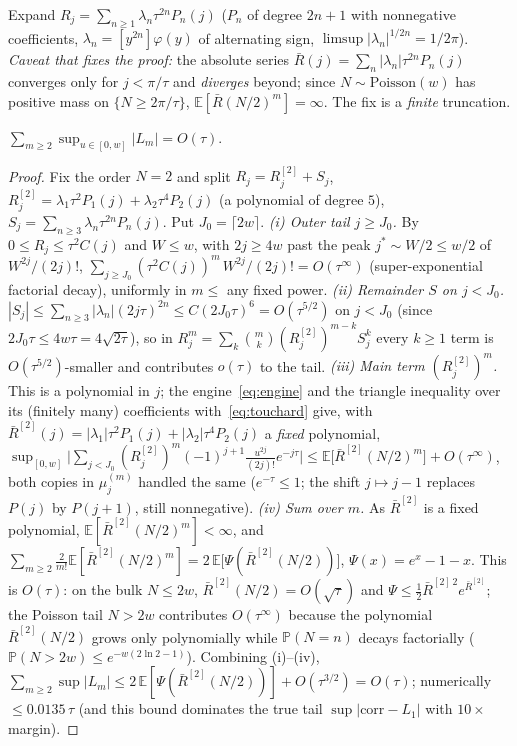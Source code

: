 Expand $R_j=\sum_{n\ge1}\lambda_n\tau^{2n}P_n(j)$ ($P_n$ of degree $2n{+}1$ with nonnegative
coefficients, $\lambda_n=[y^{2n}]\varphi(y)$ of alternating sign, $\limsup|\lambda_n|^{1/2n}=1/2\pi$).
\emph{Caveat that fixes the proof:} the absolute series $\bar R(j)=\sum_n|\lambda_n|\tau^{2n}P_n(j)$
converges only for $j<\pi/\tau$ and \emph{diverges} beyond; since $N\sim\mathrm{Poisson}(w)$ has positive
mass on $\{N\ge2\pi/\tau\}$, $\mathbb E[\bar R(N/2)^m]=\infty$. The fix is a \emph{finite} truncation.

\begin{lemma}\label{lem:tail}
$\displaystyle\sum_{m\ge2}\sup_{u\in[0,w]}|L_m|=O(\tau)$.
\end{lemma}

\begin{proof}
Fix the order $N=2$ and split $R_j=R_j^{[2]}+S_j$, $R_j^{[2]}=\lambda_1\tau^2P_1(j)+\lambda_2\tau^4P_2(j)$
(a polynomial of degree $5$), $S_j=\sum_{n\ge3}\lambda_n\tau^{2n}P_n(j)$. Put $J_0=\lceil2w\rceil$.
\emph{(i) Outer tail $j\ge J_0$.} By $0\le R_j\le\tau^2C(j)$ and $W\le w$, with $2j\ge4w$ past the peak
$j^\ast\!\sim\!W/2\le w/2$ of $W^{2j}/(2j)!$, $\sum_{j\ge J_0}(\tau^2C(j))^m\,W^{2j}/(2j)!=O(\tau^\infty)$
(super-exponential factorial decay), uniformly in $m\le$ any fixed power.
\emph{(ii) Remainder $S$ on $j<J_0$.} $|S_j|\le\sum_{n\ge3}|\lambda_n|(2j\tau)^{2n}\le C(2J_0\tau)^{6}
=O(\tau^{5/2})$ on $j<J_0$ (since $2J_0\tau\le4w\tau=4\sqrt{2\tau}$), so in $R_j^m=\sum_k\binom mk
(R_j^{[2]})^{m-k}S_j^k$ every $k\ge1$ term is $O(\tau^{5/2})$-smaller and contributes $o(\tau)$ to the tail.
\emph{(iii) Main term $(R_j^{[2]})^m$.} This is a polynomial in $j$; the engine~\eqref{eq:engine} and the
triangle inequality over its (finitely many) coefficients with~\eqref{eq:touchard} give, with
$\bar R^{[2]}(j)=|\lambda_1|\tau^2P_1(j)+|\lambda_2|\tau^4P_2(j)$ a \emph{fixed} polynomial,
$\sup_{[0,w]}\bigl|\sum_{j<J_0}(R_j^{[2]})^m(-1)^{j+1}\tfrac{u^{2j}}{(2j)!}e^{-j\tau}\bigr|
\le\mathbb E\bigl[\bar R^{[2]}(N/2)^m\bigr]+O(\tau^\infty)$, both copies in $\mu_j^{(m)}$ handled the same
($e^{-\tau}\le1$; the shift $j\mapsto j-1$ replaces $P(j)$ by $P(j{+}1)$, still nonnegative).
\emph{(iv) Sum over $m$.} As $\bar R^{[2]}$ is a fixed polynomial, $\mathbb E[\bar R^{[2]}(N/2)^m]<\infty$, and
$\sum_{m\ge2}\tfrac{2}{m!}\mathbb E[\bar R^{[2]}(N/2)^m]=2\,\mathbb E\bigl[\Psi(\bar R^{[2]}(N/2))\bigr]$,
$\Psi(x)=e^x{-}1{-}x$. This is $O(\tau)$: on the bulk $N\le2w$, $\bar R^{[2]}(N/2)=O(\sqrt\tau)$ and
$\Psi\le\tfrac12\bar R^{[2]\,2}e^{\bar R^{[2]}}$; the Poisson tail $N>2w$ contributes
$O(\tau^\infty)$ because the polynomial $\bar R^{[2]}(N/2)$ grows only polynomially while
$\mathbb P(N=n)$ decays factorially ($\mathbb P(N>2w)\le e^{-w(2\ln2-1)}$). Combining (i)--(iv),
$\sum_{m\ge2}\sup|L_m|\le2\,\mathbb E[\Psi(\bar R^{[2]}(N/2))]+O(\tau^{3/2})=O(\tau)$; numerically
$\le0.0135\,\tau$ (and this bound dominates the true tail $\sup|\mathrm{corr}-L_1|$ with $10\times$ margin).
\end{proof}

